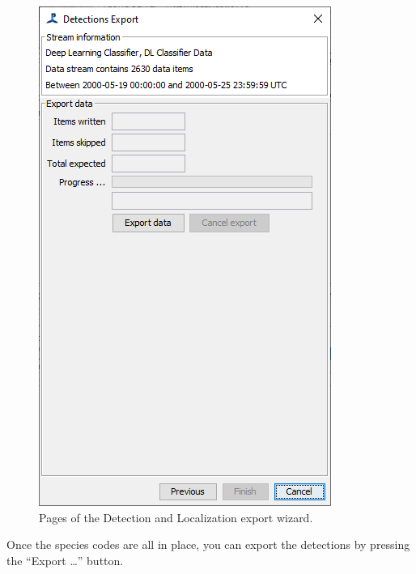 \documentclass[
]{article}
\begin{document}
\begin{figure}
\begin{minipage}{0.33\linewidth}
{\includegraphics[width=0.99\linewidth,height=\textheight,keepaspectratio]{./media/export5.png}

}


\end{minipage}%

\caption{\label{fig-export}Pages of the Detection and Localization
export wizard.}

\end{figure}%

Once the species codes are all in place, you can export the detections
by pressing the ``Export \ldots{}'' button.
\end{document}
